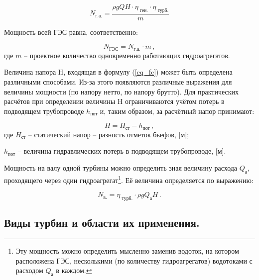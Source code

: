 \begin{equation}
\label{eq_fc}
   N_\text{г.а.} = \frac{\rho g Q H \cdot \eta_{\text{ ген.}} \cdot \eta_{\text{ турб.}}}{m}
\end{equation}

Мощность всей ГЭС равна, соответственно:

\begin{equation}
\label{eq_fd}
   N_\text{ГЭС} = N_\text{г.а.} \cdot m \, ,
\end{equation}
где $ m $ -- проектное количество одновременно работающих гидроагрегатов.

\vspace{0.5 cm}

Величина напора H, входящая в формулу (\ref{eq_fc}) может быть определена различными способами. Из-за этого появляются различные выражения для величины мощности (по напору нетто, по напору брутто). Для практических расчётов при определении величины H ограничиваются учётом потерь в подводящем трубопроводе $h_{\text{пот}}$ и, таким образом, за расчётный напор принимают:

$$
   H = H_{\text{ст}} - h_{\text{пот}} \, ,
$$
где $ H_{\text{ст}} $ -- статический напор -- разность отметок бьефов, [м];

$ h_{\text{пот}} $ -- величина гидравлических потерь в подводящем трубопроводе, [м].

\vspace{0.5 cm}

Мощность на валу одной турбины можно определить зная величину расхода $Q_\text{а}$, проходящего через один гидроагрегат\footnote{Эту мощность можно определить мысленно заменив водоток, на котором расположена ГЭС, несколькими (по количеству гидроагрегатов) водотоками с расходом $Q_\text{а}$ в каждом.}. Её величина определяется по выражению:

\begin{equation}
\label{eq_fd2}
   N_\text{в.} = \eta_{\text{ турб.}} \cdot \rho g Q_\text{а} H \, .
\end{equation}


\subsection[Виды турбин.]{Виды турбин и области их применения.}

